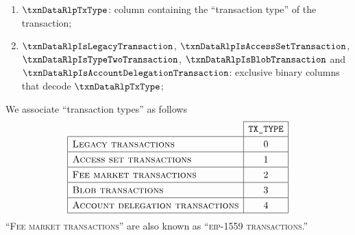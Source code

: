 \begin{enumerate}
	\item
		$\txnDataRlpTxType$:
		column containing the ``transaction type'' of the transaction;
	\item 
		$\txnDataRlpIsLegacyTransaction            $,
		$\txnDataRlpIsAccessSetTransaction         $,
		$\txnDataRlpIsTypeTwoTransaction           $,
		$\txnDataRlpIsBlobTransaction              $ and
		$\txnDataRlpIsAccountDelegationTransaction $:
		exclusive binary columns that decode
		$\txnDataRlpTxType$;
\end{enumerate}
We associate ``transaction types'' as follows
\[
	\renewcommand{\arraystretch}{1.3}
	\begin{array}{|l|c|}
		\cline{2-2}
		\multicolumn{1}{c|}{}                    & \texttt{TX\_TYPE} \\ \hline
		\textsc{Legacy transactions}             & 0                 \\ \hline
		\textsc{Access set transactions}         & 1                 \\ \hline
		\textsc{Fee market transactions}         & 2                 \\ \hline
		\textsc{Blob transactions}               & 3                 \\ \hline
		\textsc{Account delegation transactions} & 4                 \\ \hline
	\end{array}
\]
\saNote{}
``\textsc{Fee market transactions}'' are also known as ``\textsc{eip-1559 transactions}.''
